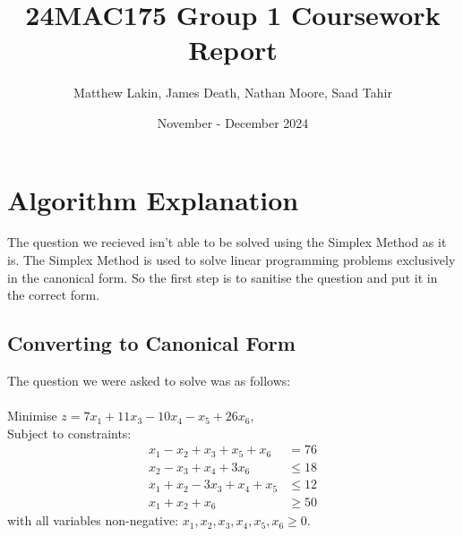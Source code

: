 \documentclass{article}
\title{24MAC175 Group 1 Coursework Report}
\author{Matthew Lakin, James Death, Nathan Moore, Saad Tahir}
\date{November - December 2024}
\numberwithin{equation}{section}
\begin{document}
\maketitle
\newpage
\tableofcontents
\newpage

\section{Algorithm Explanation}
The question we recieved  isn't able to be solved using the Simplex Method as it is. The Simplex Method is used to solve linear programming problems exclusively in the canonical form. So the first step is to sanitise the question and put it in the correct form.
\subsection{Converting to Canonical Form}
The question we were asked to solve was as follows: \\ \\
Minimise $z = 7x_1 + 11x_3 - 10x_4 - x_5 + 26x_6$,\\Subject to constraints:
\begin{align}
    x_1 - x_2 + x_3 + x_5 + x_6 &= 76  \label{lpp1:constraint1} \\
    x_2 - x_3 + x_4 + 3x_6 &\leq 18 \label{lpp1:constraint2} \\
    x_1 + x_2 - 3x_3 + x_4 + x_5 &\leq 12 \label{lpp1:constraint3} \\
    x_1 + x_2 + x_6 &\geq 50 \label{lpp1:constraint4}
\end{align}
with all variables non-negative: $x_1, x_2, x_3, x_4, x_5, x_6 \geq 0$. \\ 
\end{document}
